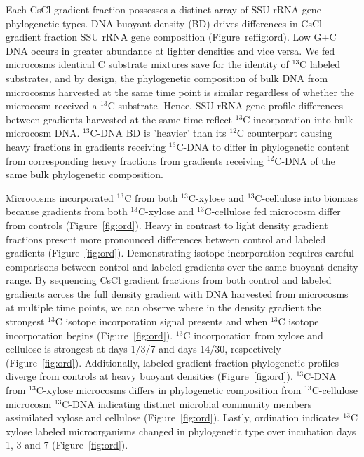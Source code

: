 Each CsCl gradient fraction possesses a distinct array of SSU rRNA gene
phylogenetic types. DNA buoyant density (BD) drives differences in CsCl
gradient fraction SSU rRNA gene composition (Figure~ref{fig:ord}). Low G+C
DNA occurs in greater abundance at lighter densities and vice versa. We
fed microcosms identical C substrate mixtures save for the identity of
$^{13}$C labeled substrates, and by design, the phylogenetic composition
of bulk DNA from microcosms harvested at the same time point is similar
regardless of whether the microcosm received a $^{13}$C substrate. Hence,
SSU rRNA gene profile differences between gradients harvested at the same
time reflect $^{13}$C incorporation into bulk microcosm DNA. $^{13}$C-DNA
BD is 'heavier' than its $^{12}$C counterpart causing heavy fractions in
gradients receiving $^{13}$C-DNA to differ in phylogenetic content from
corresponding heavy fractions from gradients receiving $^{12}$C-DNA of the
same bulk phylogenetic composition.

Microcosms incorporated $^{13}$C from both $^{13}$C-xylose and
$^{13}$C-cellulose into biomass because gradients from both $^{13}$C-xylose and
$^{13}$C-cellulose fed microcosm differ from controls (Figure~\ref{fig:ord}).
Heavy in contrast to light density gradient fractions present more pronounced
differences between control and labeled gradients (Figure~\ref{fig:ord}).
Demonstrating isotope incorporation requires careful comparisons between
control and labeled gradients over the same buoyant density range. By
sequencing CsCl gradient fractions from both control and labeled gradients
across the full density gradient with DNA harvested from microcosms at multiple
time points, we can observe where in the density gradient the strongest
$^{13}$C isotope incorporation signal presents and when $^{13}$C isotope
incorporation begins (Figure~\ref{fig:ord}). $^{13}$C incorporation from xylose
and cellulose is strongest at days 1/3/7 and days 14/30, respectively
(Figure~\ref{fig:ord}). Additionally, labeled gradient fraction phylogenetic
profiles diverge from controls at heavy buoyant densities
(Figure~\ref{fig:ord}). $^{13}$C-DNA from $^{13}$C-xylose microcosms differs in
phylogenetic composition from $^{13}$C-cellulose microcosm $^{13}$C-DNA
indicating distinct microbial community members assimilated xylose and
cellulose (Figure~\ref{fig:ord}). Lastly, ordination indicates $^{13}$C xylose
labeled microorganisms changed in phylogenetic type over incubation days 1, 3
and 7 (Figure~\ref{fig:ord}).

